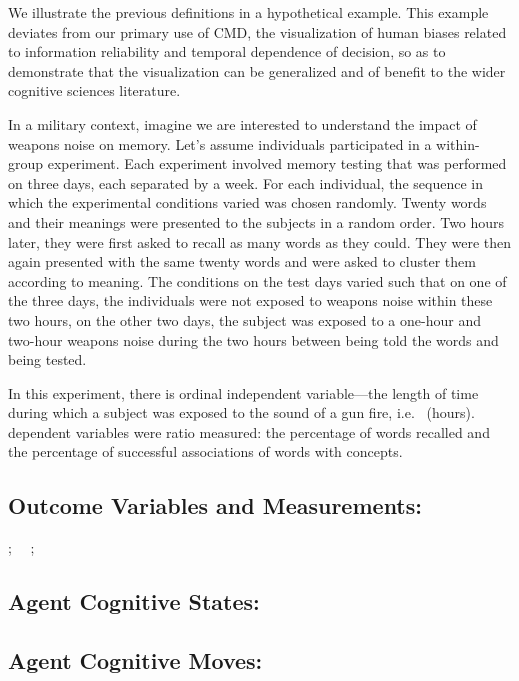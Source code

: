 \documentclass[conference]{IEEEtran}
\begin{document}
We illustrate the previous definitions in a hypothetical example. This example deviates from our
primary use of CMD, the visualization of human biases related to information reliability and
temporal dependence of decision, so as to demonstrate that the visualization can be generalized and
of benefit to the wider cognitive sciences literature.

In a military context, imagine we are interested to understand the impact of weapons noise on
memory. Let's assume  individuals participated in a within-group experiment. Each experiment
involved memory testing that was performed on three days, each separated by a week. For each
individual, the sequence in which the experimental conditions varied was chosen randomly. Twenty
words and their meanings were presented to the subjects in a random order. Two hours later, they
were first asked to recall as many words as they could. They were then again presented with the
same twenty words and were asked to cluster them according to meaning. The conditions on the test
days varied such that on one of the three days, the individuals were not exposed to weapons noise
within these two hours, on the other two days, the subject was exposed to a one-hour and two-hour
weapons noise during the two hours between being told the words and being tested.

In this experiment, there is  ordinal independent variable---the length of time during which a
subject was exposed to the sound of a gun fire, i.e. ~(hours).  dependent
variables were ratio measured: the percentage of words recalled and the percentage of successful
associations of words with concepts.

\subsection{Outcome Variables and Measurements:}







; \ \ ; \ \ 

\subsection{Agent Cognitive States:}







\subsection{Agent Cognitive Moves:}
\end{document}
